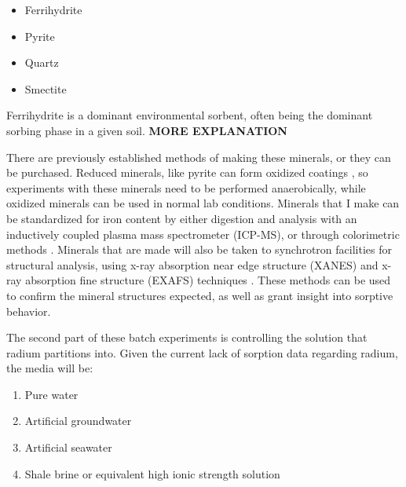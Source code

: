 \documentclass[twoside,12pt,titlepage]{article}
\begin{document}
\begin{itemize}
	\item Ferrihydrite
	\item Pyrite
	\item Quartz
	\item Smectite
\end{itemize}

\par Ferrihydrite is a dominant environmental sorbent, often being the dominant sorbing phase in a given soil. \textbf{MORE EXPLANATION}
\par There are previously established methods of making these minerals, or they can be purchased. Reduced minerals, like pyrite can form oxidized coatings \cite{Buckley1987}, so experiments with these minerals need to be performed anaerobically, while oxidized minerals can be used in normal lab conditions. Minerals that I make can be standardized for iron content by either digestion and analysis with an inductively coupled plasma mass spectrometer (ICP-MS), or through colorimetric methods \cite{Viollier2000}. Minerals that are made will also be taken to synchrotron facilities for structural analysis, using x-ray absorption near edge structure (XANES) and x-ray absorption fine structure (EXAFS) techniques \cite{Fendorf1999}. These methods can be used to confirm the mineral structures expected, as well as grant insight into sorptive behavior.
\par The second part of these batch experiments is controlling the solution that radium partitions into. Given the current lack of sorption data regarding radium, the media will be:

\begin{enumerate}[label = \roman*)]
	\item Pure water
	\item Artificial groundwater
	\item Artificial seawater
	\item Shale brine or equivalent high ionic strength solution
\end{enumerate}
\end{document}
